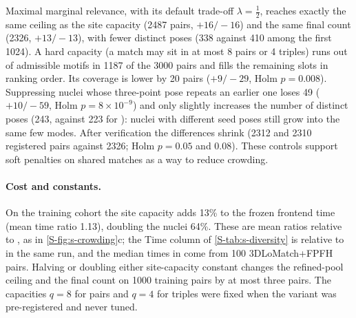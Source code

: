 Maximal marginal relevance, with its default trade-off $\lambda=\frac12$, reaches exactly the same ceiling as the site capacity (2487 pairs, $+16/-16$) and the same final count (2326, $+13/-13$), with fewer distinct poses (338 against 410 among the first 1024). A hard capacity (a match may sit in at most 8 pairs or 4 triples) runs out of admissible motifs in 1187 of the 3000 pairs and fills the remaining slots in ranking order. Its coverage is lower by 20 pairs ($+9/-29$, Holm $p=0.008$). Suppressing nuclei whose three-point pose repeats an earlier one loses 49 ($+10/-59$, Holm $p=8\times10^{-9}$) and only slightly increases the number of distinct poses (243, against 223 for \ngr{}): nuclei with different seed poses still grow into the same few modes. After verification the differences shrink (2312 and 2310 registered pairs against 2326; Holm $p=0.05$ and $0.08$). These controls support soft penalties on shared matches as a way to reduce crowding.

\paragraph{Cost and constants.} On the training cohort the site capacity adds 13\% to the frozen frontend time (mean time ratio 1.13), doubling the nuclei 64\%. These are mean ratios relative to \ngr{}, as in \cref{S-fig:s-crowding}c; the Time column of \cref{S-tab:s-diversity} is relative to \ls{} in the same run, and the median times in  come from 100 3DLoMatch+FPFH pairs. Halving or doubling either site-capacity constant changes the refined-pool ceiling and the final count on 1000 training pairs by at most three pairs. The capacities $q=8$ for pairs and $q=4$ for triples were fixed when the variant was pre-registered and never tuned.
